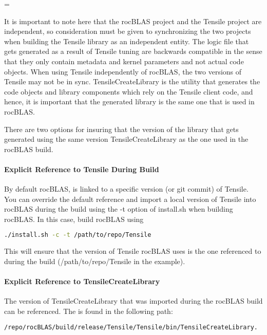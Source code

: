 \documentclass[]{article}
\newenvironment{warning}
{\par\begin{mdframed}[linewidth=2pt,linecolor=red]
		\begin{list}{}{\leftmargin=1cm
				\labelwidth=\leftmargin}\item[\Large\ding{43}]}
		{\end{list}\end{mdframed}\par}
\begin{document}
\begin{warning}
	It is important to note here that the rocBLAS project and the Tensile project are independent, so consideration must be given to synchronizing the two projects when building the Tensile library as an independent entity. The logic file that gets generated as a result of Tensile tuning are backwards compatible in the sense that they only contain metadata and kernel parameters and not actual code objects. When using Tensile independently of rocBLAS, the two versions of Tensile may not be in sync. TensileCreateLibrary is the utility that generates the code objects and library components which rely on the Tensile client code, and hence, it is important that the generated library is the same one that is used in rocBLAS.
\end{warning}

There are two options for insuring that the version of the library that gets generated using the same version TensileCreateLibrary as the one used in the rocBLAS build.

\paragraph{Explicit Reference to Tensile During Build}
By default rocBLAS, is linked to a specific version (or git commit) of Tensile. You can override the default reference and import a local version of Tensile into rocBLAS during the build using the -t option of install.sh when building rocBLAS. In this case, build rocBLAS using

\begin{lstlisting}[language=bash]
./install.sh -c -t /path/to/repo/Tensile 
\end{lstlisting}

\noindent
This will ensure that the version of Tensile rocBLAS uses is the one referenced to during the build (/path/to/repo/Tensile in the example). 

\paragraph{Explicit Reference to TensileCreateLibrary}

The version of TensileCreateLibrary that was imported during the rocBLAS build can be referenced. The is found in the following path:

\begin{lstlisting}[language=bash]
/repo/rocBLAS/build/release/Tensile/Tensile/bin/TensileCreateLibrary.
\end{lstlisting}
\end{document}
